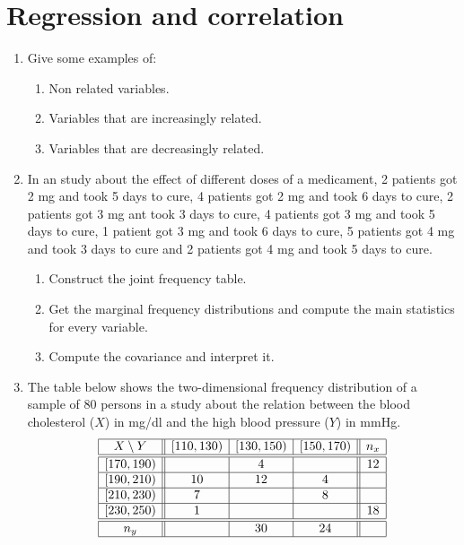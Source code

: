 
\section{Regression and correlation}
\begin{enumerate}[leftmargin=*,resume]
\item Give some examples of:
\begin{enumerate}
\item Non related variables.
\item Variables that are increasingly related.
\item Variables that are decreasingly related.
\end{enumerate}

\item In an study about the effect of different doses of a medicament, 2 patients got 2 mg and took 5 days to cure, 4
patients got 2 mg and took 6 days to cure, 2 patients got 3 mg ant took 3 days to cure, 4 patients got 3 mg and took 5
days to cure, 1 patient got 3 mg and took 6 days to cure, 5 patients got 4 mg and took 3 days to cure and 2 patients got
4 mg and took 5 days to cure. 
\begin{enumerate}
\item Construct the joint frequency table.
\item Get the marginal frequency distributions and compute the main statistics for every variable. 
\item Compute the covariance and interpret it. 
\end{enumerate}

\item The table below shows the two-dimensional frequency distribution of a sample of 80 persons in a study about the
relation between the blood cholesterol ($X$) in mg/dl and the high blood pressure ($Y$) in mmHg.
\[
\begin{array}{|c||c|c|c||c|}
\hline
X\setminus Y & [110,130) & [130,150) & [150,170) & n_x \\
\hline\hline
[170,190)   &           &     4     &           & 12\\
\hline
[190,210)   &    10     &    12     &     4     &   \\
\hline
[210,230)   &     7     &           &     8     &   \\
\hline
[230,250)   &     1     &           &           & 18\\
\hline\hline
n_y          &           &    30     &    24    &    \\
\hline
\end{array}
\]


\end{enumerate}
